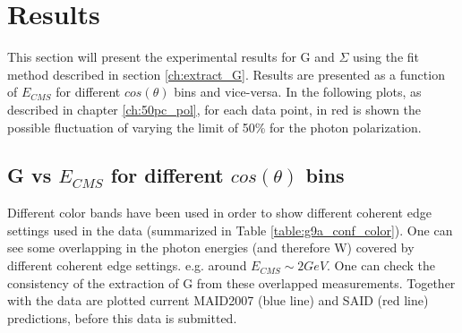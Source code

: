 \section{Results}
This section will present the experimental results for G and $\Sigma$ using the fit method described in section \ref{ch:extract_G}. 
Results are presented as a function of $E_{CMS}$ for different $cos(\theta)$ bins and vice-versa. 
In the following plots, as described in chapter \ref{ch:50pc_pol}, for each data point, in red is shown the possible fluctuation of varying the limit of 50\% for the photon polarization. 


\subsection{G vs \texorpdfstring{$E_{CMS}$}{E-CMS} for different \texorpdfstring{$cos(\theta)$}{cos(theta)} bins}\label{ch:result_W}
Different color bands have been used in order to show different coherent edge settings used in the data (summarized in Table \ref{table:g9a_conf_color}). One can see some overlapping in the photon energies (and therefore W) covered by different coherent edge settings. e.g.  around $E_{CMS} \sim 2 GeV$. One can check the consistency of the extraction of G from these overlapped measurements. Together with the data are plotted current MAID2007 \cite{MAID_2007} (blue line)  and SAID \cite{PhysRevC.86.015202} (red line) predictions, before this data is submitted.
